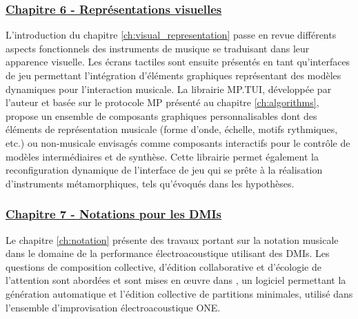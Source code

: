 \subsubsection*{\hyperref[ch:visual_representation]{Chapitre 6 - Représentations visuelles}}

\noindent L'introduction du chapitre \ref{ch:visual_representation} passe en revue différents aspects fonctionnels des instruments de musique se traduisant dans leur apparence visuelle. Les écrans tactiles sont ensuite présentés en tant qu'interfaces de jeu permettant l'intégration d'éléments graphiques représentant des modèles dynamiques pour l'interaction musicale. La librairie MP.TUI, développée par l'auteur et basée sur le protocole MP présenté au chapitre  \ref{ch:algorithms}, propose un ensemble de composants graphiques personnalisables dont des éléments de représentation musicale (forme d'onde, échelle, motifs rythmiques, etc.) ou non-musicale envisagés comme composants interactifs pour le contrôle de modèles intermédiaires et de synthèse. Cette librairie permet également la reconfiguration dynamique de l'interface de jeu qui se prête à la réalisation d'instruments métamorphiques, tels qu'évoqués dans les hypothèses.

\subsubsection*{\hyperref[ch:notation]{Chapitre 7 - Notations pour les DMIs}} 
\noindent Le chapitre \ref{ch:notation} présente des travaux portant sur la notation musicale dans le domaine de la performance électroacoustique utilisant des \glspl{DMI}. Les questions de composition collective, d'édition collaborative et d'écologie de l'attention sont abordées et sont mises en œuvre dans , un logiciel permettant la génération automatique et l'édition collective de partitions minimales, utilisé dans l'ensemble d'improvisation électroacoustique ONE. 







